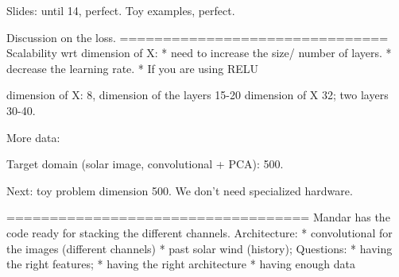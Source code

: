 Slides: until 14, perfect.
Toy examples, perfect. 

Discussion on the loss.
===============================
Scalability wrt dimension of X:
* need to increase the size/ number of layers.
* decrease the learning rate. 
* If you are using RELU

dimension of X: 8, dimension of the layers 15-20
dimension of X 32; two layers 30-40.

More data: 

Target domain (solar image, convolutional + PCA): 500. 

Next: toy problem dimension 500. We don't need specialized hardware. 

===================================
Mandar has the code ready for stacking the different channels. 
Architecture:
* convolutional for the images (different channels)
* past solar wind (history); 
Questions:
* having the right features;
* having the right architecture
* having enough data

